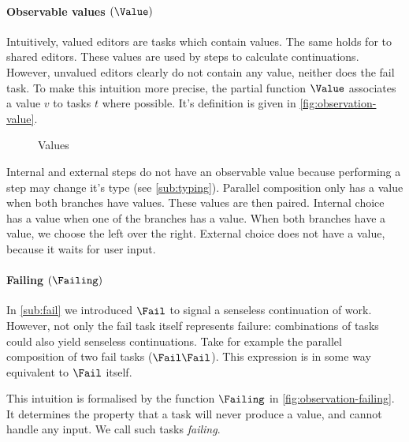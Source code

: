 \paragraph{Observable values $(\Value)$}

Intuitively, valued editors are tasks which contain values.
The same holds for to shared editors.
These values are used by steps to calculate continuations.
However, unvalued editors clearly do not contain any value,
neither does the fail task.
To make this intuition more precise,
the partial function $\Value$ associates a value $v$ to tasks $t$ where possible.
It's definition is given in \autoref{fig:observation-value}.

\begin{figure}[h]
  \small
  \caption{Values} \label{fig:observation-value}
\end{figure}

Internal and external steps do not have an observable value because performing a step may change it's type (see \autoref{sub:typing}).
Parallel composition only has a value when both branches have values.
These values are then paired.
Internal choice has a value when one of the branches has a value.
When both branches have a value, we choose the left over the right.
External choice does not have a value, because it waits for user input.



\paragraph{Failing $(\Failing)$}

In \autoref{sub:fail} we introduced $\Fail$ to signal a senseless continuation of work.
However, not only the fail task itself represents failure:
combinations of tasks could also yield senseless continuations.
Take for example the parallel composition of two fail tasks ($\Fail \And \Fail$).
This expression is in some way equivalent to $\Fail$ itself.

This intuition is formalised by the function $\Failing$ in \autoref{fig:observation-failing}.
It determines the property that a task
will never produce a value, and
cannot handle any input.
We call such tasks \emph{failing}.


